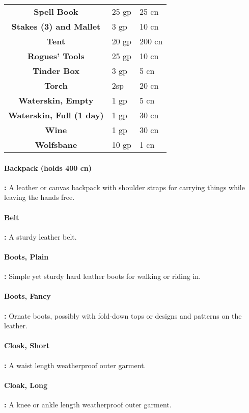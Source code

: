 \begin{multicols*}{2}
\begin {table}[H]
\begin{tabularx}{\columnwidth}{>{\bfseries}cYY}
		Spell Book & 25 gp & 25 cn\\
		Stakes (3) and Mallet & 3 gp & 10 cn\\
		Tent & 20 gp & 200 cn\\
		Rogues’ Tools & 25 gp & 10 cn\\
		Tinder Box & 3 gp & 5 cn\\
		Torch & 2sp & 20 cn\\
		Waterskin, Empty & 1 gp & 5 cn\\
		Waterskin, Full (1 day) & 1 gp & 30 cn\\
		Wine & 1 gp & 30 cn\\
		Wolfsbane & 10 gp & 1 cn\
  \end {tabularx}
\end {table}

\paragraph{Backpack (holds 400 cn)}\textbf{:} A leather or canvas backpack with shoulder straps for carrying things while leaving the hands free.

\paragraph{Belt}\textbf{:} A sturdy leather belt.

\paragraph{Boots, Plain}\textbf{:} Simple yet sturdy hard leather boots for walking or riding in.

\paragraph{Boots, Fancy}\textbf{:} Ornate boots, possibly with fold-down tops or designs and patterns on the leather.

\paragraph{Cloak, Short}\textbf{:} A waist length weatherproof outer garment.

\paragraph{Cloak, Long}\textbf{:} A knee or ankle length weatherproof outer garment.


\end{multicols*}

